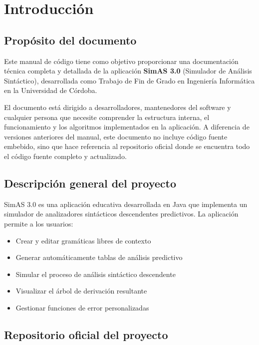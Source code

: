\chapter{Introducción}\label{cap-introduccion}

\section{Propósito del documento}

Este manual de código tiene como objetivo proporcionar una documentación técnica completa y detallada de la aplicación \textbf{SimAS 3.0} (Simulador de Análisis Sintáctico), desarrollada como Trabajo de Fin de Grado en Ingeniería Informática en la Universidad de Córdoba.

El documento está dirigido a desarrolladores, mantenedores del software y cualquier persona que necesite comprender la estructura interna, el funcionamiento y los algoritmos implementados en la aplicación. A diferencia de versiones anteriores del manual, este documento no incluye código fuente embebido, sino que hace referencia al repositorio oficial donde se encuentra todo el código fuente completo y actualizado.

\section{Descripción general del proyecto}

SimAS 3.0 es una aplicación educativa desarrollada en Java que implementa un simulador de analizadores sintácticos descendentes predictivos. La aplicación permite a los usuarios:

\begin{itemize}
    \item Crear y editar gramáticas libres de contexto
    \item Generar automáticamente tablas de análisis predictivo
    \item Simular el proceso de análisis sintáctico descendente
    \item Visualizar el árbol de derivación resultante
    \item Gestionar funciones de error personalizadas
\end{itemize}

\section{Repositorio oficial del proyecto}

